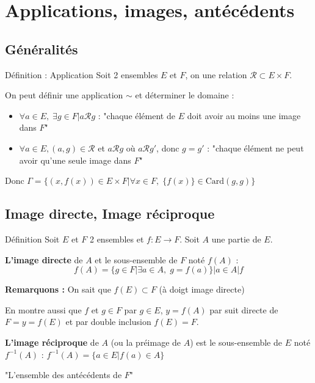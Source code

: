 \documentclass[a4paper,11pt]{article}
\begin{document}
\newpage
\section{Applications, images, antécédents}

\subsection{Généralités}

\begin{defbox}{Définition : Application}
Soit 2 ensembles $E$ et $F$, on une relation $\mathcal{R} \subset E \times F$.

On peut définir une application $\sim$ et déterminer le domaine :
\begin{itemize}
    \item $\forall a \in E, \; \exists g \in F | a \mathcal{R} g$ : "chaque élément de $E$ doit avoir au moins une image dans $F$"
    \item $\forall a \in E, (a, g) \in \mathcal{R}$ et $a \mathcal{R} g$ où $a \mathcal{R} g'$, donc $g = g'$ : "chaque élément ne peut avoir qu'une seule image dans $F$"
\end{itemize}

Donc $\Gamma = \{(x, f(x)) \in E \times F | \forall x \in F, \; \{f(x)\} \in \text{Card}(g, g)\}$
\end{defbox}

\subsection{Image directe, Image réciproque}

\begin{defbox}{Définition}
Soit $E$ et $F$ 2 ensembles et $f : E \to F$. Soit $A$ une partie de $E$.

\textbf{L'image directe} de $A$ et le sous-ensemble de $F$ noté $f(A)$ :
\[f(A) = \{g \in F | \exists a \in A, \; g = f(a)\} | a \in A | f\]

\textbf{Remarquons :} On sait que $f(E) \subset F$ (à doigt image directe)

En montre aussi que $f$ et $g \in F$ par $g \in E$, $y = f(A)$ par suit directe de $F = y = f(E)$ et par double inclusion $f(E) = F$.

\textbf{L'image réciproque} de $A$ (ou la préimage de $A$) est le sous-ensemble de $E$ noté $f^{-1}(A)$ : $f^{-1}(A) = \{a \in E | f(a) \in A\}$

"L'ensemble des antécédents de $F$"
\end{defbox}
\end{document}
